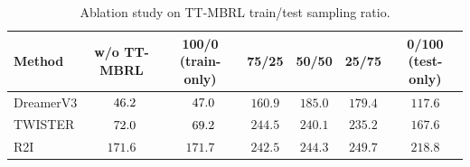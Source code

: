 \begin{table}[ht]
    \caption{Ablation study on TT-MBRL train/test sampling ratio.}
    \centering
    \setlength{\tabcolsep}{4.5pt}
    \hfill \break
    \begin{tabular}{lcccccc}
    \toprule
    \textbf{Method} & \textbf{w/o TT-MBRL} & \textbf{100/0 (train-only)} & \textbf{75/25} & \textbf{50/50} & \textbf{25/75} & \textbf{0/100 (test-only)} \\
    \midrule
    DreamerV3 & $\hphantom{0}46.2$ & $\hphantom{0}47.0$ & $160.9$ & $\mathbf{185.0}$ & $179.4$ & $117.6$ \\
    TWISTER & $\hphantom{0}72.0$ & $\hphantom{0}69.2$ & $\mathbf{244.5}$ & $240.1$ & $235.2$ & $167.6$ \\
    R2I & $171.6$ & $171.7$ & $242.5$ & $244.3$ & $\mathbf{249.7}$ & $218.8$ \\
    \bottomrule
    \end{tabular}
    \label{table:study_train_test_ratio}
\end{table}